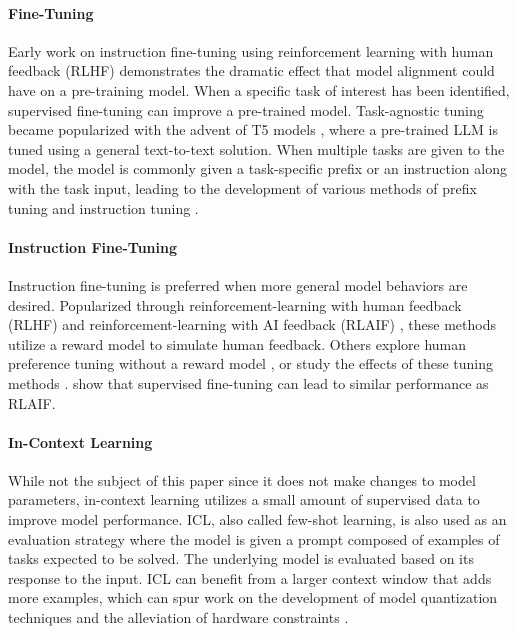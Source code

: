 \paragraph{Fine-Tuning}
Early work on instruction fine-tuning using reinforcement learning with human feedback (RLHF) \cite{ziegler2019fine, stiennon2020learning, ouyang2022training} demonstrates the dramatic effect that model alignment could have on a pre-training model. 
When a specific task of interest has been identified, supervised fine-tuning can improve a pre-trained model. 
Task-agnostic tuning became popularized with the advent of T5 models \citep{raffel2020exploring}, where a pre-trained LLM is tuned using a general text-to-text solution. 
When multiple tasks are given to the model, the model is commonly given a task-specific prefix or an instruction along with the task input, leading to the development of various methods of prefix tuning \cite{li-liang-2021-prefix} and instruction tuning \cite{wei2021finetuned, mishra-etal-2022-cross, victor2022multitask}.

\paragraph{Instruction Fine-Tuning}
Instruction fine-tuning is preferred when more general model behaviors are desired. 
Popularized through reinforcement-learning with human feedback (RLHF) \cite{christiano2017deep, ziegler2019fine, stiennon2020learning, ouyang2022training} and reinforcement-learning with AI feedback (RLAIF) \cite{lee2023rlaif}, these methods utilize a reward model to simulate human feedback.
Others explore human preference tuning without a reward model \cite{rafailov2024direct, song2024preference, xu2024contrastive}, or study the effects of these tuning methods \citep{shen2024bidirectional,perez-etal-2023-discovering}.
\citet{sharma2024critical} show that supervised fine-tuning can lead to similar performance as RLAIF.

\paragraph{In-Context Learning}
While not the subject of this paper since it does not make changes to model parameters, in-context learning utilizes a small amount of supervised data to improve model performance. 
ICL, also called few-shot learning, 
is also used as an evaluation strategy where the model is given a prompt composed of examples of tasks expected to be solved. The underlying model is evaluated based on its response to the input. 
ICL can benefit from a larger context window that adds more examples, which can spur work on the development of model quantization techniques \cite{dettmers2022gpt3} and the alleviation of hardware constraints \cite{brown2020language, xie2021explanation, min-etal-2022-rethinking}.

